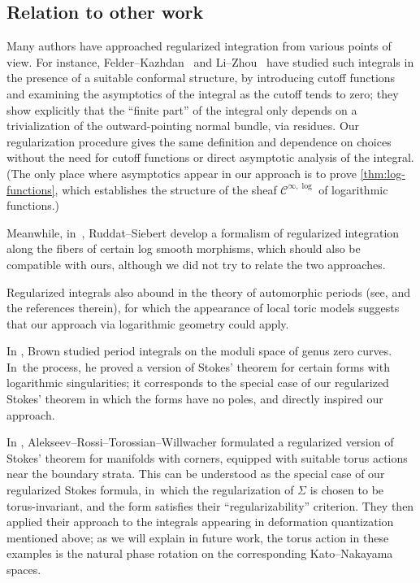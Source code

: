 \documentclass[JEP,XML,SOM,Unicode,NoFloatCountersInSection,published]{cedram}
\theoremstyle{definition}
\theoremstyle{remark}
\newcommand{\Cinflog}[1]{\mathscr{C}^{\infty,\log}_{#1}}
\newcommand{\Sig}{\Sigma}
\begin{document}
\subsection{Relation to other work}

Many authors have approached regularized integration from various points of view. For instance, Felder--Kazhdan~\cite{Felder2017,Felder2018} and Li--Zhou~\cite{Li2021,Li2023} have studied such integrals in the presence of a suitable conformal structure, by introducing cutoff functions and examining the asymptotics of the integral as the cutoff tends to zero; they show explicitly that the ``finite part'' of the integral only depends on a trivialization of the outward-pointing normal bundle, via residues. Our regularization procedure gives the same definition and dependence on choices without the need for cutoff functions or direct asymptotic analysis of the integral. (The only place where asymptotics appear in our approach is to prove \autoref{thm:log-functions}, which establishes the structure of the sheaf $\Cinflog{}$ of logarithmic functions.)

Meanwhile, in~\cite{RuddatSiebert}, Ruddat--Siebert develop a formalism of regularized integration along the fibers of certain log smooth morphisms, which should also be compatible with ours, although we did not try to relate the two approaches.

Regularized integrals also abound in the theory of automorphic periods (see, \eg \cite{Zydor} and the references therein), for which the appearance of local toric models \cite{Sakellaridis} suggests that our approach via logarithmic geometry could apply.

In \cite{Brown2009}, Brown studied period integrals on the moduli space of genus zero curves. In~the process, he proved a version of Stokes' theorem for certain forms with logarithmic singularities; it corresponds to the special case of our regularized Stokes' theorem in which the forms have no poles, and directly inspired our approach.

In \cite{AlekseevRossiTorossianWillwacher:Logs}, Alekseev--Rossi--Torossian--Willwacher formulated a regularized version of Stokes' theorem for manifolds with corners, equipped with suitable torus actions near the boundary strata. This can be understood as the special case of our regularized Stokes formula, in~which the regularization of $\Sig$ is chosen to be torus-invariant, and the form satisfies their ``regularizability'' criterion. They then applied their approach to the integrals appearing in deformation quantization mentioned above; as we will explain in future work, the torus action in these examples is the natural phase rotation on the corresponding Kato--Nakayama spaces.
\end{document}
